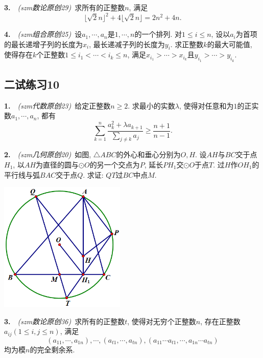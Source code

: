 \newpage

\textbf{3.}~~\textit{(szm数论原创29)}~求所有的正整数$n$, 满足$$\lfloor \sqrt{2}n \rfloor ^2 + 4\lfloor \sqrt{2}n \rfloor = 2n^2+4n.$$

\vspace{24em}

\textbf{4.}~~\textit{(szm组合原创25)}~设$a_1,\cdots ,a_n$是$1,\cdots ,n$的一个排列. 对$1 \leq i \leq n$, 设以$a_i$为首项的最长递增子列的长度为$x_i$, 最长递减子列的长度为$y_i$. 求正整数$k$的最大可能值, 使得存在$k$个正整数$1 \leq i_1 < \cdots <i_k \leq n$, 满足$x_{i_1} > \cdots >x_{i_k}$且$y_{i_1} > \cdots >y_{i_k}$. 

\newpage
\subsection*{二试练习10}

\textbf{1.}~~\textit{(szm代数原创23)}~给定正整数$n \geq 2$. 求最小的实数$\lambda$, 使得对任意和为$1$的正实数$a_1,\cdots ,a_n$, 都有$$\sum_{k=1}^{n} \frac{a_k^2+\lambda a_{k+1}}{\sum_{j \neq k}a_j} \geq \frac{n+1}{n-1}.$$

\vspace{21em}



\textbf{2.}~~\textit{(szm几何原创20)}~如图, $\triangle ABC$的外心和垂心分别为$O,H$. 设$AH$与$BC$交于点$H_1$, 以$AH$为直径的圆与$\odot O$的另一个交点为$P$, 延长$PH_1$交$\odot O$于点$T$. 过$H$作$OH_1$的平行线与弧$BAC$交于点$Q$. 求证: $QT$过$BC$中点$M$. 

\vspace{2em}
\includegraphics[width=6cm]{attachment/g20.png}


\newpage

\textbf{3.}~~\textit{(szm数论原创36)}~求所有的正整数$t$, 使得对无穷个正整数$n$, 存在正整数$a_{ij}(1 \leq i,j \leq n)$, 满足$$(a_{11},\cdots ,a_{1n}),\cdots ,(a_{t1},\cdots ,a_{tn}),(a_{11} \cdots a_{t1} ,\cdots ,a_{1n} \cdots a_{tn})$$
均为模$n$的完全剩余系. 

